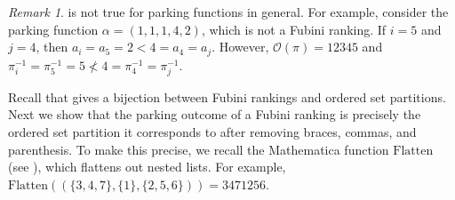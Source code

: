 \documentclass{amsart}
\newcommand{\Flatten}[0]{\mathrm{Flatten}}
\theoremstyle{definition}
\theoremstyle{definition}
\theoremstyle{remark}
\newtheorem{remark}{Remark}[section]
\newcommand{\out}{\mathcal{O}}
\begin{document}
\begin{remark}
 is not true for parking functions in general. For example, consider the parking function $\alpha=(1,1,1,4,2)$, which is not a Fubini ranking. 
If $i=5$ and $j=4$, then $a_{i}=a_5=2<4=a_{4}=a_{j}$. However,  $\out(\pi)=12345$ and $\pi_{i}^{-1}=\pi_5^{-1}=5  \nless 4=\pi_4^{-1}=\pi_{j}^{-1}$.
\end{remark}

Recall that  gives a bijection between Fubini rankings and ordered set partitions. Next we show that the parking outcome of a Fubini ranking is precisely the ordered set partition it corresponds to after removing braces, commas, and parenthesis. 
To make this precise, we recall the Mathematica function $\Flatten$ (see \cite{flatten}), which flattens out nested lists. For example, $\Flatten((\{3,4,7\},\{1\},\{2,5,6\}))=3471256$.
    
\end{document}
